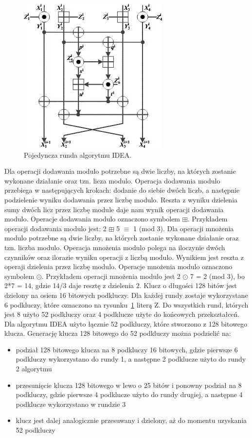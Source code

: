 \documentclass[12p]{article}
\begin{document}
\begin{figure}[H]
\centering
\includegraphics{IDEA.jpg}
\caption{Pojedyncza runda algorytmu IDEA.~\cite{IDEA}}\label{idea}
\end{figure}


Dla operacji dodawania modulo potrzebne są dwie liczby, na których zostanie wykonane działanie oraz tzn. licza modulo. Operacja dodawania modulo przebiega w następujących krokach: dodanie do siebie dwóch liczb, a następnie podzielenie wyniku dodawania przez liczbę modulo. Reszta z wyniku dzielenia sumy dwóch licz przez liczbę module daje nam wynik operacji dodawania modulo. Operacje dodawania modulo oznaczono symbolem $\boxplus$. Przykładem operacji dodawania modulo jest: 2 $\boxplus$ 5 $\equiv$ 1 (mod 3). Dla operacji mnożenia modulo potrzebne są dwie liczby, na których zostanie wykonane działanie oraz tzn. liczba modulo. Operacja mnożenia modulo polega na iloczynie dwóch czynników oraz ilorazie wyniku operacji z liczbą modulo. Wynikiem jest reszta z operaji dzielenia przez liczbę modulo.  Operacje mnożenia modulo oznaczono symbolem $\odot$. Przykładem operacji mnożenia modulo jest 2  $\odot$ 7 = 2 (mod 3), bo 2*7 = 14, gdzie 14/3 daje resztę z dzielenia 2.
Klucz o długości 128 bitów jest dzielony na osiem 16 bitowych podkluczy. Dla każdej rundy zostaje wykorzystane 6 podkluczy, które oznaczono na rysunku~\ref{idea} literą Z. Do wszystkich rund, których jest 8 użyto 52 podkluczy oraz 4 podklucze użyte do końcowych przekształceń. Dla algorytmu IDEA użyto łącznie 52 podkluczy, które stworzono z 128 bitowego klucza. Generację klucza 128 bitowego do 52 podkluczy można podzielić na:
\begin{itemize}
\item podział 128 bitowego klucza na 8 podkluczy 16 bitowych, gdzie pierwsze 6 podkluczy wykorzystano do rundy 1, a następne 2 podklucze użyto do rundy 2 algorytmu
\item przesunięcie klucza 128 bitowego w lewo o 25 bitów i ponowny podział na 8 podkluczy, gdzie pierwsze 4 podklucze użyto do rundy drugiej, a następne 4 podklucze wykorzystano w rundzie 3
\item klucz jest dalej analogicznie przesuwany i dzielony, aż do momentu uzyskania 52 podkluczy
\end{itemize}
\end{document}
